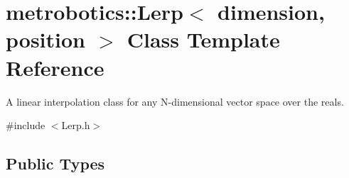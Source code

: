 \hypertarget{classmetrobotics_1_1Lerp}{\section{metrobotics\-:\-:\-Lerp$<$ dimension, position $>$ \-Class \-Template \-Reference}
\label{classmetrobotics_1_1Lerp}
}


\-A linear interpolation class for any \-N-\/dimensional vector space over the reals.  




{\ttfamily \#include $<$\-Lerp.\-h$>$}

\subsection*{\-Public \-Types}
